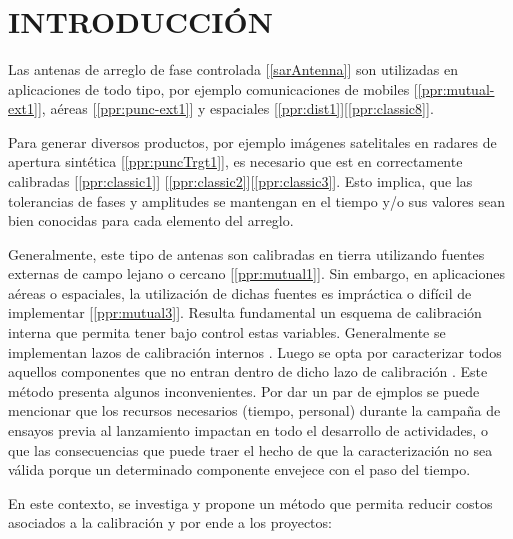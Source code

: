 \documentclass[a4paper,10pt]{article}
\title{  }
\begin{document}
	\maketitle %
	
	\tableofcontents %
	\newpage

	\section{INTRODUCCIÓN}
    
Las antenas de arreglo de fase controlada [\ref{sarAntenna}] son utilizadas en 
aplicaciones de todo tipo, por ejemplo comunicaciones de mobiles 
[\ref{ppr:mutual-ext1}], aéreas [\ref{ppr:punc-ext1}] y espaciales 
[\ref{ppr:dist1}][\ref{ppr:classic8}]. 

Para generar diversos productos, por ejemplo imágenes satelitales en radares de
apertura sintética [\ref{ppr:puncTrgt1}], 
es necesario que est en correctamente calibradas [\ref{ppr:classic1}] 
[\ref{ppr:classic2}][\ref{ppr:classic3}]. Esto implica, que las tolerancias de
fases y amplitudes se mantengan en el tiempo y/o sus valores sean bien conocidas
para cada elemento del arreglo.

Generalmente, este tipo de antenas son calibradas en tierra utilizando fuentes 
externas de campo lejano o cercano [\ref{ppr:mutual1}]. Sin embargo, en 
aplicaciones aéreas o espaciales, la utilización de dichas fuentes es impráctica
o difícil de implementar [\ref{ppr:mutual3}]. Resulta fundamental un esquema de
calibración interna que permita tener bajo control estas variables. Generalmente
se implementan lazos de calibración internos . 
Luego se opta por caracterizar todos aquellos componentes que no entran dentro 
de dicho lazo de calibración . 
Este método presenta algunos inconvenientes. Por dar un par de ejmplos se puede
mencionar que los recursos necesarios (tiempo, personal) durante la campaña de 
ensayos previa al lanzamiento impactan en todo el desarrollo de actividades, o
que las consecuencias que puede traer el hecho de que la caracterización no sea
válida porque un determinado componente envejece con el paso del tiempo.

En este contexto, se investiga y propone un método que permita reducir costos 
asociados a la calibración y por ende a los proyectos:
\end{document}
